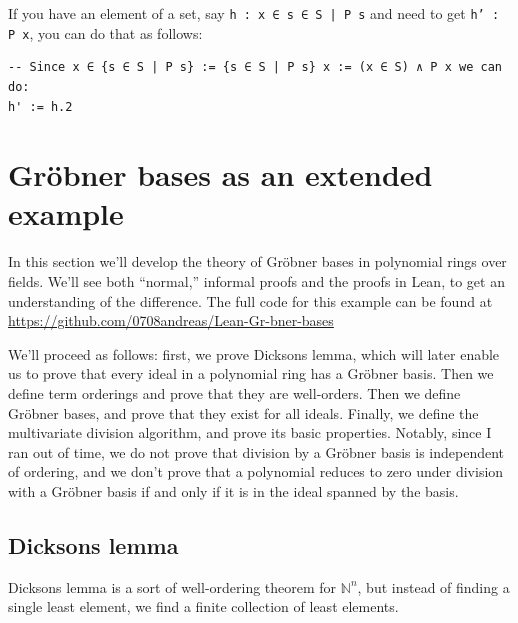 \documentclass[a4paper, 12pt]{article}
\newcommand{\N}{\mathbb{N}}
\newcommand{\lean}[1]{\texttt{#1}}
\theoremstyle{changedot}
\theoremstyle{changedotbreak}
\theoremstyle{nonumberplain}
\begin{document}
If you have an element of a set, say \texttt{h : x ∈ {s ∈ S | P s}} and need to get \lean{h' : P x}, you can do that as follows:

\begin{verbatim}
-- Since x ∈ {s ∈ S | P s} := {s ∈ S | P s} x := (x ∈ S) ∧ P x we can do:
h' := h.2
\end{verbatim}



\section{Gröbner bases as an extended example}
In this section we'll develop the theory of Gröbner bases in polynomial rings over fields. We'll see both ``normal,'' informal proofs and the proofs in Lean, to get an understanding of the difference. The full code for this example can be found at \url{https://github.com/0708andreas/Lean-Gr-bner-bases}

We'll proceed as follows: first, we prove Dicksons lemma, which will later enable us to prove that every ideal in a polynomial ring has a Gröbner basis. Then we define term orderings and prove that they are well-orders. Then we define Gröbner bases, and prove that they exist for all ideals. Finally, we define the multivariate division algorithm, and prove its basic properties. Notably, since I ran out of time, we do not prove that division by a Gröbner basis is independent of ordering, and we don't prove that a polynomial reduces to zero under division with a Gröbner basis if and only if it is in the ideal spanned by the basis.

\subsection{Dicksons lemma}
Dicksons lemma is a sort of well-ordering theorem for $\N^{n}$, but instead of finding a single least element, we find a finite collection of least elements.
\end{document}
